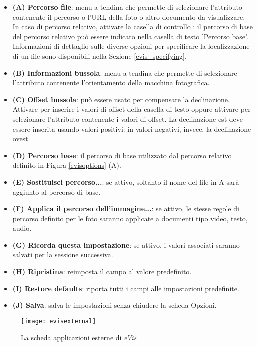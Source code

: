 \begin{itemize}[label=--]
\item \textbf{(A) Percorso file}: menu a tendina che permette di selezionare l'attributo contenente il 
percorso o l'URL della foto o altro documento da visualizzare. 
In caso di percorso relativo, attivare la casella di controllo : 
il percorso di base del percorso relativo può essere indicato nella casella di testo 'Percorso base'.
Informazioni di dettaglio sulle diverse opzioni per specificare la localizzazione di un file sono
disponibili nella Sezione \ref{evis_specifying}.
\item \textbf{(B) Informazioni bussola}: menu a tendina che permette di selezionare l'attributo contenente
l'orientamento della macchina fotografica.
\item \textbf{(C) Offset bussola}: può essere usato per compensare la declinazione. Attivare 
per inserire i valori di offset della casella di testo oppure attivare  per 
selezionare l'attributo contenente i valori di offset. La declinazione est deve essere inserita usando valori 
positivi: in valori negativi, invece, la declinazione ovest.
\item \textbf{(D) Percorso base}: il percorso di base utilizzato dal percorso relativo definito in Figura \ref{evisoptions} (A).
\item \textbf{(E) Sostituisci percorso...}: se attivo, soltanto il nome del file in A sarà aggiunto al percorso di base. 
\item \textbf{(F) Applica il percorso dell'immagine...}: se attivo, le stesse regole di percorso definito per le foto 
	saranno applicate a documenti tipo video, testo, audio.
\item \textbf{(G) Ricorda questa impostazione}: se attivo, i valori associati saranno salvati per la sessione successiva.
\item \textbf{(H) Ripristina}: reimposta il campo al valore predefinito.
\item \textbf{(I) Restore defaults}: riporta tutti i campi alle impostazioni predefinite.
\item \textbf{(J) Salva}: salva le impostazioni senza chiudere la scheda Opzioni.
\end{itemize}

\label{evis_external_window}

\begin{figure}[htp]
   \centering
   \texttt{[image: evisexternal]}
   \caption{La scheda applicazioni esterne di \emph{eVis} \nixcaption}\label{evisexternal}
\end{figure}

